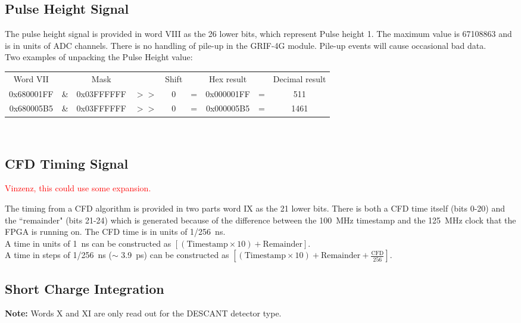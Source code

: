\documentclass[letterpaper,12pt,notitlepage]{report}
\begin{document}
\subsection{Pulse Height Signal}
The pulse height signal is provided in word VIII as the 26 lower bits, which represent Pulse height 1. The maximum value is 67108863 and is in units of ADC channels. There is no handling of pile-up in the GRIF-4G module. Pile-up events will cause occasional bad data.\\

Two examples of unpacking the Pulse Height value:\\

\begin{tabular}{ccccccccc}
Word VII &  & Mask & & Shift & & Hex result & & Decimal result\\
0x680001FF & \& & 0x03FFFFFF & $>>$ & 0 & = & 0x000001FF & = & 511\\
0x680005B5 & \& & 0x03FFFFFF & $>>$ & 0 & = & 0x000005B5 & = & 1461\\
\end{tabular}\\

\subsection{CFD Timing Signal}

\textcolor{red}{Vinzenz, this could use some expansion.}

The timing from a CFD algorithm is provided in two parts word IX as the 21 lower bits. There is both a CFD time itself (bits 0-20) and the ``remainder" (bits 21-24) which is generated because of the difference between the 100~MHz timestamp and the 125~MHz clock that the FPGA is running on. The CFD time is in units of 1/256~ns.\\

A time in units of 1~ns can be constructed as $[(\text{Timestamp} \times 10) + \text{Remainder}]$.\\

A time in steps of 1/256~ns ($\sim$ 3.9~ps) can be constructed as $[(\text{Timestamp} \times 10) + \text{Remainder} + \frac{\text{CFD}}{256}]$.\\

\subsection{Short Charge Integration}
{\bf Note:} Words X and XI are only read out for the DESCANT detector type.\\
\end{document}
